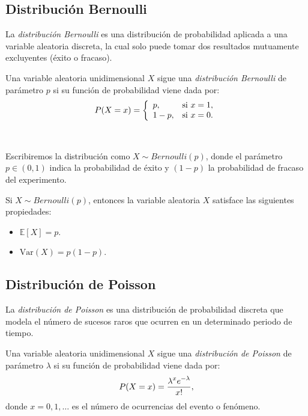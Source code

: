 \documentclass[oneside,openright,titlepage,numbers=noenddot,openany,headinclude,footinclude=true,
cleardoublepage=empty,abstractoff,BCOR=5mm,paper=a4,fontsize=12pt,main=spanish]{scrreprt}
\begin{document}
\subsection*{Distribución Bernoulli}

La \textit{distribución Bernoulli} es una distribución de probabilidad aplicada a una variable aleatoria discreta, la cual solo puede tomar dos resultados mutuamente excluyentes (éxito o fracaso).\\

\begin{definition}
Una variable aleatoria unidimensional $X$ sigue una \textit{distribución Bernoulli} de parámetro $p$ si su función de probabilidad viene dada por: $$P(X=x)=\left \{
\begin{array}{l l}
p, & \mbox{si } x = 1, \\
1-p, & \mbox{si } x =0.
\end{array}
\right.$$
\end{definition}\

Escribiremos la distribución como $X \sim Bernoulli(p)$, donde el parámetro $p\in (0,1)$ indica la probabilidad de éxito y $(1-p)$ la probabilidad de fracaso del experimento.\\

\begin{proposition}[Propiedades]
Si $X \sim Bernoulli(p)$, entonces la variable aleatoria $X$ satisface las siguientes propiedades:
\begin{itemize}
    \item $\mathbb{E}[X]=p$.
    \item $\text{Var}(X)=p(1-p)$.
\end{itemize}
\end{proposition}

\clearpage

\subsection*{Distribución de Poisson}

La \textit{distribución de Poisson} es una distribución de probabilidad discreta que modela el número de sucesos raros que ocurren en un determinado periodo de tiempo.\\

\begin{definition}
Una variable aleatoria unidimensional $X$ sigue una \textit{distribución de Poisson} de parámetro $\lambda$ si su función de probabilidad viene dada por: $$P(X=x)=\frac{\displaystyle \lambda^xe^{-\lambda}}{\displaystyle x!},$$
donde $x=0,1,\dots$ es el número de ocurrencias del evento o fenómeno.
\end{definition}\
\end{document}
